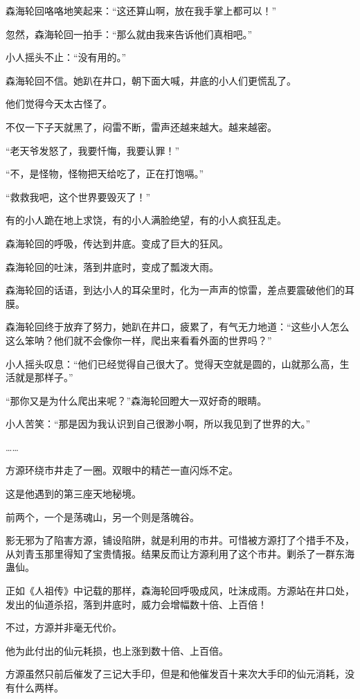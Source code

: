 \begin{this_body}
森海轮回咯咯地笑起来：“这还算山啊，放在我手掌上都可以！”

忽然，森海轮回一拍手：“那么就由我来告诉他们真相吧。”

小人摇头不止：“没有用的。”

森海轮回不信。她趴在井口，朝下面大喊，井底的小人们更慌乱了。

他们觉得今天太古怪了。

不仅一下子天就黑了，闷雷不断，雷声还越来越大。越来越密。

“老天爷发怒了，我要忏悔，我要认罪！”

“不，是怪物，怪物把天给吃了，正在打饱嗝。”

“救救我吧，这个世界要毁灭了！”

有的小人跪在地上求饶，有的小人满脸绝望，有的小人疯狂乱走。

森海轮回的呼吸，传达到井底。变成了巨大的狂风。

森海轮回的吐沫，落到井底时，变成了瓢泼大雨。

森海轮回的话语，到达小人的耳朵里时，化为一声声的惊雷，差点要震破他们的耳膜。

森海轮回终于放弃了努力，她趴在井口，疲累了，有气无力地道：“这些小人怎么这么笨呐？他们就不会像你一样，爬出来看看外面的世界吗？”

小人摇头叹息：“他们已经觉得自己很大了。觉得天空就是圆的，山就那么高，生活就是那样子。”

“那你又是为什么爬出来呢？”森海轮回瞪大一双好奇的眼睛。

小人苦笑：“那是因为我认识到自己很渺小啊，所以我见到了世界的大。”

……

方源环绕市井走了一圈。双眼中的精芒一直闪烁不定。

这是他遇到的第三座天地秘境。

前两个，一个是荡魂山，另一个则是落魄谷。

影无邪为了陷害方源，铺设陷阱，就是利用的市井。可惜被方源打了个措手不及，从刘青玉那里得知了宝贵情报。结果反而让方源利用了这个市井。剿杀了一群东海蛊仙。

正如《人祖传》中记载的那样，森海轮回呼吸成风，吐沫成雨。方源站在井口处，发出的仙道杀招，落到井底时，威力会增幅数十倍、上百倍！

不过，方源并非毫无代价。

他为此付出的仙元耗损，也上涨到数十倍、上百倍。

方源虽然只前后催发了三记大手印，但是和他催发百十来次大手印的仙元消耗，没有什么两样。


\end{this_body}

